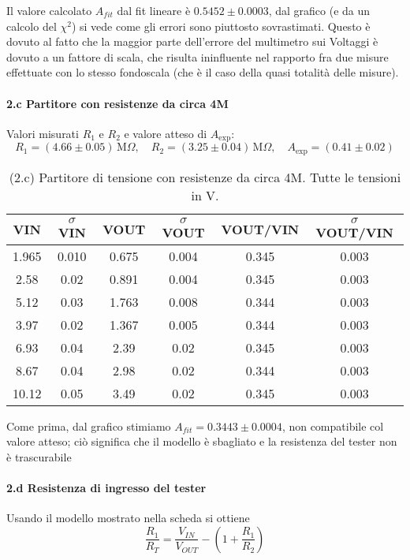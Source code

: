 \documentclass[10pt,a4paper]{article}
\begin{document}
Il valore calcolato $A_{fit}$ dal fit lineare è $ 0.5452\pm0.0003$, dal grafico (e da un  calcolo del $\chi^2$) si vede come gli errori sono piuttosto sovrastimati. Questo  è dovuto al fatto che la maggior parte dell'errore del multimetro sui Voltaggi è dovuto a un fattore di scala, che risulta ininfluente nel rapporto fra due misure effettuate con lo stesso fondoscala  (che è il caso della quasi totalità delle misure).


\paragraph{2.c Partitore con resistenze da circa 4M}
Valori misurati $R_1$ e $R_2$ e valore atteso di $A_\mathrm{exp}$:
\[
R_1 = ( 4.66 \pm 0.05 ) \,\mathrm{M}\Omega, \quad
R_2 = ( 3.25 \pm 0.04 ) \,\mathrm{M}\Omega, \quad
A_\mathrm{exp} = ( 0.41 \pm0.02 ) 
\]


\begin{table}[h]
\centering
\begin{tabular}{|c|c|c|c|c|c|}
\hline 
VIN& $\sigma$ VIN  &VOUT	 & $\sigma$ VOUT& VOUT/VIN & $\sigma$ VOUT/VIN \\
\hline 
1.965 & 0.010 & 0.675 & 0.004 & 0.345 & 0.003 \\
2.58 & 0.02 & 0.891 & 0.004 & 0.345 & 0.003 \\
5.12 & 0.03 & 1.763 & 0.008 & 0.344 & 0.003 \\
3.97 & 0.02 & 1.367 & 0.005 & 0.344 & 0.003 \\
6.93 & 0.04 & 2.39 & 0.02 & 0.345 & 0.003 \\
8.67 & 0.04 & 2.98 & 0.02 & 0.344 & 0.003 \\
10.12 & 0.05 & 3.49 & 0.02 & 0.345 & 0.003\\


\hline 
\end{tabular} 
\caption{(2.c) Partitore di tensione con resistenze da circa 4M. Tutte le tensioni in V.\label{t:par2}}
\end{table}




Come prima, dal grafico stimiamo $A_{fit}=0.3443\pm0.0004$, non compatibile col valore atteso; ciò significa che il modello è sbagliato e la resistenza del tester non è trascurabile



\paragraph{2.d Resistenza di ingresso del tester}
Usando il modello mostrato nella scheda si ottiene
\[ \frac{R_1}{R_T} =  \frac{V_{IN}}{V_{OUT}} - (1 +  \frac{R_1}{R_2} )
\]
\end{document}
